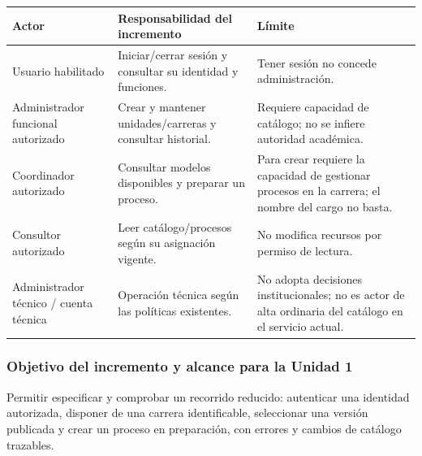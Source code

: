 \documentclass[11pt,a4paper]{article}
\begin{document}
{\def\LTcaptype{none} %
\begin{longtable}[]{@{}
  >{\raggedright\arraybackslash}p{}
  >{\raggedright\arraybackslash}p{}
  >{\raggedright\arraybackslash}p{}@{}}
\toprule\noalign{}
\begin{minipage}[b]{\linewidth}\raggedright
Actor
\end{minipage} & \begin{minipage}[b]{\linewidth}\raggedright
Responsabilidad del incremento
\end{minipage} & \begin{minipage}[b]{\linewidth}\raggedright
Límite
\end{minipage} \\
\midrule\noalign{}
\endhead
\bottomrule\noalign{}
\endlastfoot
Usuario habilitado & Iniciar/cerrar sesión y consultar su identidad y
funciones. & Tener sesión no concede administración. \\
Administrador funcional autorizado & Crear y mantener unidades/carreras
y consultar historial. & Requiere capacidad de catálogo; no se infiere
autoridad académica. \\
Coordinador autorizado & Consultar modelos disponibles y preparar un
proceso. & Para crear requiere la capacidad de gestionar procesos en la
carrera; el nombre del cargo no basta. \\
Consultor autorizado & Leer catálogo/procesos según su asignación
vigente. & No modifica recursos por permiso de lectura. \\
Administrador técnico / cuenta técnica & Operación técnica según las
políticas existentes. & No adopta decisiones institucionales; no es
actor de alta ordinaria del catálogo en el servicio actual. \\
\end{longtable}
}

\subsubsection{Objetivo del incremento y alcance para la Unidad
1}\label{objetivo-del-incremento-y-alcance-para-la-unidad-1}

Permitir especificar y comprobar un recorrido reducido: autenticar una
identidad autorizada, disponer de una carrera identificable, seleccionar
una versión publicada y crear un proceso en preparación, con errores y
cambios de catálogo trazables.
\end{document}
